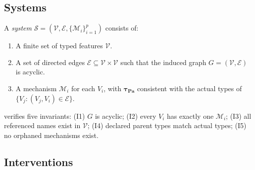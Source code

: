 \documentclass[article]{jss}
\begin{document}
\subsection{Systems}
\label{sec:system_def}

\begin{definition}[System]
\label{def:system}
A \emph{system} $\mathcal{S} = (\mathcal{V}, \mathcal{E}, \{\mathcal{M}_i\}_{i=1}^p)$
consists of:
\begin{enumerate}[nosep,leftmargin=2em]
  \item A finite set of typed features $\mathcal{V}$.
  \item A set of directed edges $\mathcal{E} \subseteq \mathcal{V}\times\mathcal{V}$
        such that the induced graph $G = (\mathcal{V}, \mathcal{E})$ is acyclic.
  \item A mechanism $\mathcal{M}_i$ for each $V_i$, with
        $\boldsymbol\tau_{\mathbf{Pa}}$ consistent with the actual types of
        $\{V_j : (V_j,V_i)\in\mathcal{E}\}$.
\end{enumerate}
 verifies five invariants: (I1) $G$ is acyclic; (I2) every
$V_i$ has exactly one $\mathcal{M}_i$; (I3) all referenced names exist in
$\mathcal{V}$; (I4) declared parent types match actual types; (I5) no orphaned
mechanisms exist.
\end{definition}

\subsection{Interventions}
\label{sec:intervention_def}
\end{document}
